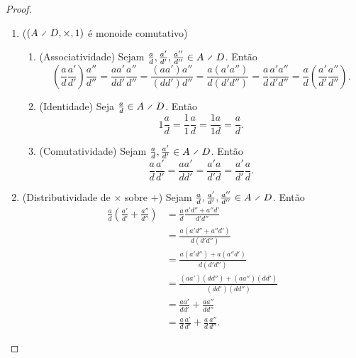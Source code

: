 \begin{proof}
\begin{enumerate}
	\item ($(A \olddiv D,\times,1)$ é monoide comutativo)
		\begin{enumerate}
		\item (Associatividade) Sejam $\frac{a}{d},\frac{a'}{d'},\frac{a''}{d''} \in A \olddiv D$. Então
			\begin{equation*}
			\left( \frac{a}{d}\frac{a'}{d'} \right)\frac{a''}{d''} = \frac{aa'}{dd'}\frac{a''}{d''} = \frac{(aa')a''}{(dd')d''} =  \frac{a(a'a'')}{d(d'd'')} = \frac{a}{d}\frac{a'a''}{d'd''} = \frac{a}{d} \left( \frac{a'}{d'}\frac{a''}{d''} \right).
			\end{equation*}

		\item (Identidade) Seja $\frac{a}{d} \in A \olddiv D$. Então
			\begin{equation*}
			1\frac{a}{d} = \frac{1}{1}\frac{a}{d} = \frac{1a}{1d} = \frac{a}{d}.
			\end{equation*}

		\item (Comutatividade) Sejam $\frac{a}{d},\frac{a'}{d'} \in A \olddiv D$. Então
			\begin{equation*}
			\frac{a}{d}\frac{a'}{d'}= \frac{aa'}{dd'} = \frac{a'a}{d'd} = \frac{a'}{d'}\frac{a}{d}.
			\end{equation*}
		\end{enumerate}

	\item (Distributividade de $\times$ sobre $+$) Sejam $\frac{a}{d},\frac{a'}{d'},\frac{a''}{d''} \in A \olddiv D$. Então
		\begin{align*}
		\frac{a}{d} \left( \frac{a'}{d'} + \frac{a''}{d''} \right) &= \frac{a}{d}\frac{a'd''+a''d'}{d'd''} \\
			&= \frac{a(a'd''+a''d')}{d(d'd'')} \\
			&= \frac{a(a'd'')+a(a''d')}{d(d'd'')} \\
			&= \frac{(aa')(dd'')+(aa'')(dd')}{(dd')(dd'')}  \\
			&= \frac{aa'}{dd'} + \frac{aa''}{dd''}  \\
			&= \frac{a}{d}\frac{a'}{d'} + \frac{a}{d}\frac{a''}{d''}.
		\end{align*}
	\end{enumerate}
\end{proof}

